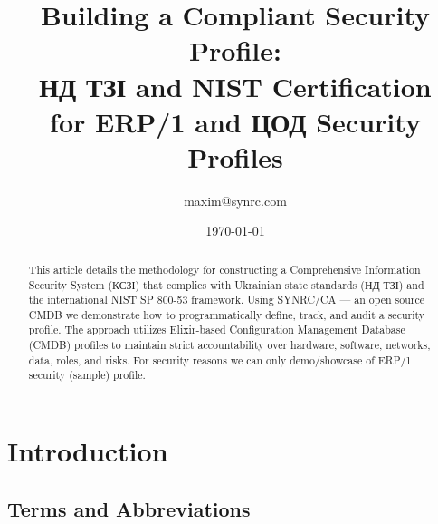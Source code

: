 \documentclass{article}
\title{Building a Compliant Security Profile:\\ \foreignlanguage{ukrainian}{НД \foreignlanguage{ukrainian}{ТЗІ}} and NIST Certification \\ for ERP/1 and \foreignlanguage{ukrainian}{ЦОД} Security Profiles}
\author{maxim@synrc.com}
\date{\today}
\begin{document}
\maketitle
{}

\begin{abstract}
This article details the methodology for constructing a Comprehensive Information Security System
(\foreignlanguage{ukrainian}{КСЗІ}) that complies with Ukrainian state standards
(\foreignlanguage{ukrainian}{НД \foreignlanguage{ukrainian}{ТЗІ}}) and the international NIST SP 800-53 framework.
Using SYNRC/CA --- an open source CMDB we demonstrate how to programmatically define, track, and audit a security profile.
The approach utilizes Elixir-based Configuration Management Database (CMDB) profiles to maintain strict accountability over hardware,
software, networks, data, roles, and risks. For security reasons we can only demo/showcase of ERP/1 security (sample) profile.
\end{abstract}

\setcounter{tocdepth}{2}
\newpage
\tableofcontents

\newpage
\section{Introduction}

\subsection{Terms and Abbreviations}
\end{document}
